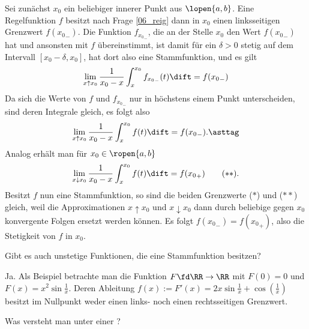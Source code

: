 \begin{antwort}
Sei zunächst $x_0$ ein beliebiger innerer Punkt aus $\lopen{a,b}$. 
Eine Regelfunktion $f$ besitzt nach Frage \ref{06_reig} dann 
in $x_0$ einen linksseitigen Grenzwert $f({x_0}_-)$. 
Die Funktion $f_{{x_0}_-}$, die an der Stelle $x_0$ den Wert 
$f({x_0}_-)$ hat und ansonsten mit $f$ übereinstimmt, ist damit 
für ein $\delta>0$ stetig auf dem Intervall $[x_0-\delta, x_0]$,  
hat dort also eine Stammfunktion, und es gilt
\[
\lim_{x\uparrow x_0} \frac{1}{x_0-x} \int_{x}^{x_0} f_{{x_0}_-} (t) \dift 
= f( {x_0}_- )
\] 
Da sich die Werte von $f$ und $f_{{x_0}_-}$ nur in höchstens einem 
Punkt unterscheiden, sind deren Integrale gleich, es folgt also 
\begin{equation}
\lim_{x\uparrow x_0} \frac{1}{x_0-x} \int_{x}^{x_0} f (t) \dift 
= f( {x_0}_- ).
\asttag
\end{equation}
Analog erhält man für $x_0 \in \ropen{a,b}$
\begin{equation}
\lim_{x\downarrow x_0} \frac{1}{x_0-x} \int_{x}^{x_0} f (t) \dift 
= f( {x_0}_+ )
\tag{$\ast\ast$}. 
\end{equation} 
Besitzt $f$ nun eine Stammfunktion, so sind die beiden Grenzwerte 
($\ast$) und ($\ast\ast$) gleich, weil die Approximationen 
$x\uparrow x_0$ und $x\downarrow x_0$ dann durch beliebige 
gegen $x_0$ konvergente Folgen ersetzt werden können. 
Es folgt  
$f({x_0}_-)=f({x_0}_+)$, also die Stetigkeit von $f$ in $x_0$. 
\AntEnd    
\end{antwort}  

\begin{frage}
Gibt es auch unstetige Funktionen, die eine Stammfunktion besitzen?
\end{frage}  
 
\begin{antwort}
Ja. Als Beispiel betrachte man die Funktion 
$F\fd \RR \to \RR$ mit $F(0)=0$ 
und $F(x)=x^2\sin \frac{1}{x}$. Deren Ableitung 
$f(x):=F'(x)=2x\sin \frac{1}{x}+\cos(\frac{1}{x})$ 
besitzt im Nullpunkt weder einen links- noch einen rechtsseitigen Grenzwert.
\AntEnd 
\end{antwort}


\begin{frage}
Was versteht man unter einer ?
\end{frage}

